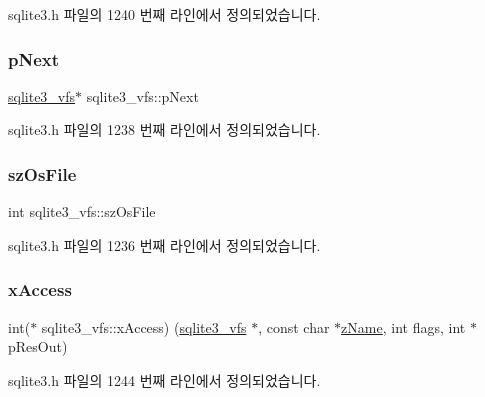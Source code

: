 sqlite3.\+h 파일의 1240 번째 라인에서 정의되었습니다.

\mbox{\label{structsqlite3__vfs_ae795a4417697ecd35163f6cdf0069073}} 
\subsubsection{\texorpdfstring{p\+Next}{pNext}}
{\footnotesize\ttfamily \hyperlink{structsqlite3__vfs}{sqlite3\+\_\+vfs}$\ast$ sqlite3\+\_\+vfs\+::p\+Next}



sqlite3.\+h 파일의 1238 번째 라인에서 정의되었습니다.

\mbox{\label{structsqlite3__vfs_a549399081342d61134b6398562a0a997}} 
\subsubsection{\texorpdfstring{sz\+Os\+File}{szOsFile}}
{\footnotesize\ttfamily int sqlite3\+\_\+vfs\+::sz\+Os\+File}



sqlite3.\+h 파일의 1236 번째 라인에서 정의되었습니다.

\mbox{\label{structsqlite3__vfs_a3a5cc43f1b8a88747eb77db730ce4f69}} 
\subsubsection{\texorpdfstring{x\+Access}{xAccess}}
{\footnotesize\ttfamily int($\ast$ sqlite3\+\_\+vfs\+::x\+Access) (\hyperlink{structsqlite3__vfs}{sqlite3\+\_\+vfs} $\ast$, const char $\ast$\hyperlink{structsqlite3__vfs_a0f06a27ac2201ea04c0623ef19e5d73e}{z\+Name}, int flags, int $\ast$p\+Res\+Out)}



sqlite3.\+h 파일의 1244 번째 라인에서 정의되었습니다.

\mbox{\label{structsqlite3__vfs_a925aa81bcf67f2daf50ad59de850ef41}} 
